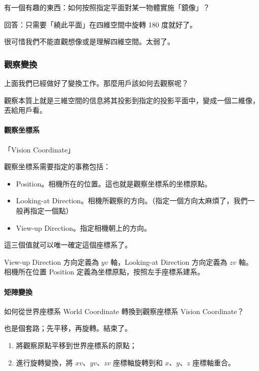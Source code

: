 \documentclass[
]{article}
\begin{document}
有一個有趣的東西：如何按照指定平面對某一物體實施「鏡像」？

回答：只需要「繞此平面」在四維空間中旋轉 180 度就好了。

很可惜我們不能直觀想像或是理解四維空間。太弱了。

\hypertarget{header-n34}{%
\subsubsection{觀察變換}\label{header-n34}}

上面我們已經做好了變換工作。那麼用戶該如何去觀察呢？

觀察本質上就是三維空間的信息將其投影到指定的投影平面中，變成一個二維像，丟給用戶看。

\hypertarget{header-n37}{%
\paragraph{觀察坐標系}\label{header-n37}}

「Vision Coordinate」

觀察坐標系需要指定的事務包括：

\begin{itemize}
\item
  Position。相機所在的位置。這也就是觀察坐標系的坐標原點。
\item
  Looking-at
  Direction。相機所觀察的方向。（指定一個方向太麻煩了，我們一般再指定一個點）
\item
  View-up Direction。指定相機朝上的方向。
\end{itemize}

這三個值就可以唯一確定這個座標系了。

View-up Direction 方向定義為 \(yv\) 軸，Looking-at Direction 方向定義為
\(zv\) 軸。相機所在位置 Position 定義為坐標原點，按照左手座標系建系。

\hypertarget{header-n49}{%
\paragraph{矩陣變換}\label{header-n49}}

如何從世界座標系 World Coordinate 轉換到觀察座標系 Vision Coordinate？

也是個套路；先平移，再旋轉。結束了。

\begin{enumerate}
\def\labelenumi{\arabic{enumi}.}
\item
  將觀察原點平移到世界座標系的原點；
\item
  進行旋轉變換，將 \(xv\)、\(yv\)、\(zv\) 座標軸旋轉到和
  \(x\)、\(y\)、\(z\) 座標軸重合。
\end{enumerate}
\end{document}
